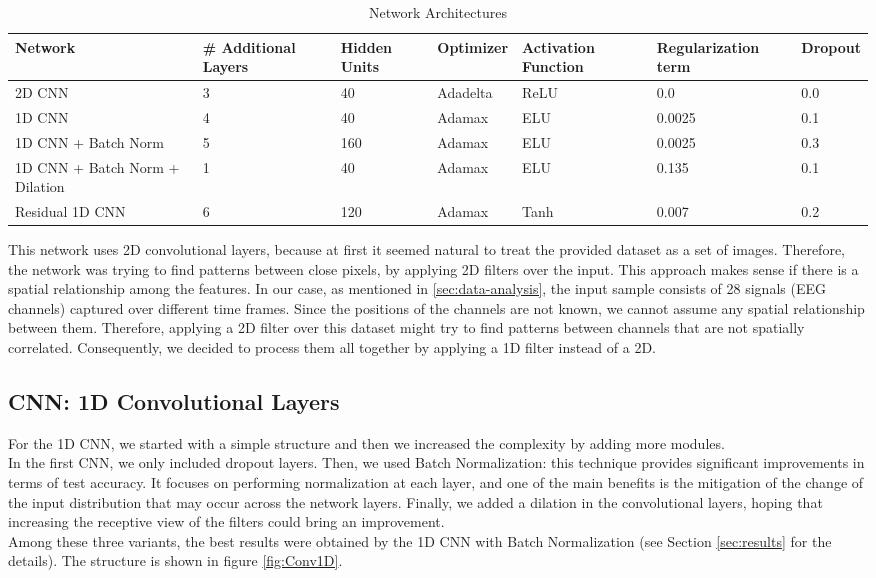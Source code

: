 \documentclass[10pt,conference,compsocconf]{IEEEtran}
\begin{document}
\begin{table}
	\caption{Network Architectures}
	\label{tab:netarch}
	\begin{tabular}{ | p{3cm} | p{2cm} | p{2cm} | p{2cm} | p{2cm} | p{2cm} | p{2cm} | }
		\hline
		Network & \# Additional Layers & Hidden Units & Optimizer & Activation Function & Regularization term & Dropout\\
		\hline
		2D CNN
		& 3 & 40 & Adadelta & ReLU & 0.0 & 0.0 \\
		\hline
		1D CNN
		& 4 & 40 & Adamax & ELU & 0.0025 & 0.1 \\
		\hline
		1D CNN + Batch Norm
		& 5 & 160 & Adamax & ELU & 0.0025 & 0.3 \\
		\hline
		1D CNN + Batch Norm + Dilation
		& 1 & 40 & Adamax & ELU & 0.135 & 0.1 \\
		\hline
		Residual 1D CNN
		& 6 & 120 & Adamax & Tanh & 0.007 & 0.2 \\
		\hline
	\end{tabular}
\end{table}

This network uses 2D convolutional layers, because at first it seemed natural to treat the provided dataset as a set of images. Therefore, the network was trying to find patterns between close pixels, by applying 2D filters over the input. This approach makes sense if there is a spatial relationship among the features. In our case, as mentioned in \ref{sec:data-analysis}, the input sample consists of 28 signals (EEG channels) captured over different time frames. Since the positions of the channels are not known, we cannot assume any spatial relationship between them. Therefore, applying a 2D filter over this dataset might try to find patterns between channels that are not spatially correlated. Consequently, we decided to process them all together by applying a 1D filter instead of a 2D. 


\subsection{CNN: 1D Convolutional Layers}
For the 1D CNN, we started with a simple structure and then we increased the complexity by adding more modules.\\
In the first CNN, we only included dropout layers. Then, we used Batch Normalization: this technique provides significant improvements in terms of test accuracy. It focuses on performing normalization at each layer, and one of the main benefits is the mitigation of the change of the input distribution that may occur across the network layers. Finally, we added a dilation in the convolutional layers, hoping that increasing the receptive view of the filters could bring an improvement.\\
Among these three variants, the best results were obtained by the 1D CNN with Batch Normalization (see Section \ref{sec:results} for the details). The structure is shown in figure \ref{fig:Conv1D}.
\end{document}
